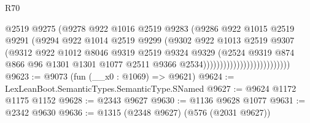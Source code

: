 \begin{lexlean}{R70}
\begin{coremodule}
                                            @2519
                                            @9275
                                            (@9278
                                              @922
                                              @1016
                                              @2519
                                              @9283
                                              (@9286
                                                @922
                                                @1015
                                                @2519
                                                @9291
                                                (@9294
                                                  @922
                                                  @1014
                                                  @2519
                                                  @9299
                                                  (@9302
                                                    @922
                                                    @1013
                                                    @2519
                                                    @9307
                                                    (@9312
                                                      @922
                                                      @1012
                                                      @8046
                                                      @9319
                                                      @2519
                                                      @9324
                                                      @9329
                                                      (@2524
                                                        @9319
                                                        @874
                                                        @866
                                                        @96
                                                        @1301
                                                        @1301
                                                        @1077
                                                        @2511
                                                        @9366
                                                        @2534))))))))))))))))))))))))))
@9623 := @9073 (fun (__x0 : @1069) => @9621)
@9624 := LexLeanBoot.SemanticTypes.SemanticType.SNamed
@9627 := @9624 @1172 @1175 @1152
@9628 := @2343 @9627
@9630 := @1136 @9628 @1077
@9631 := @2342 @9630
@9636 := @1315 (@2348 @9627) (@576 (@2031 @9627))

\end{coremodule}
\end{lexlean}
